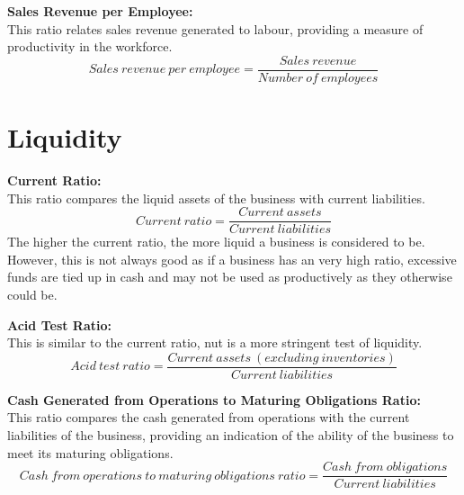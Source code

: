 \documentclass{report}
\newenvironment{blackbox}[1][Black]
  {\begin{tcolorbox}[colframe=#1,colback=white]}
  {\end{tcolorbox}}
\begin{document}
\begin{blackbox}
    \textbf{Sales Revenue per Employee:}\\
    This ratio relates sales revenue generated to labour, providing a measure of productivity in the workforce.
    \begin{equation}
        Sales \: revenue \: per \: employee = \frac{Sales \: revenue}{Number \: of \: employees}
    \end{equation}
\end{blackbox}

\section{Liquidity}

\begin{blackbox}
    \textbf{Current Ratio:}\\
    This ratio compares the liquid assets of the business with current liabilities.
    \begin{equation}
        Current \: ratio = \frac{Current \: assets}{Current \: liabilities}
    \end{equation}
    The higher the current ratio, the more liquid a business is considered to be. However, this is not always good as if a business has an very high ratio, excessive funds are tied up in cash and may not be used as productively as they otherwise could be.
\end{blackbox}

\begin{blackbox}
    \textbf{Acid Test Ratio:}\\
    This is similar to the current ratio, nut is a more stringent test of liquidity.
    \begin{equation}
        Acid \: test \: ratio = \frac{Current \: assets \: (excluding \: inventories)}{Current \: liabilities}
    \end{equation}
\end{blackbox}

\begin{blackbox}
    \textbf{Cash Generated from Operations to Maturing Obligations Ratio:}\\
    This ratio compares the cash generated from operations with the current liabilities of the business, providing an indication of the ability of the business to meet its maturing obligations.
    \begin{equation}
        Cash \: from \: operations \: to \: maturing \: obligations \: ratio = \frac{Cash \: from \: obligations}{Current \: liabilities}
    \end{equation}
\end{blackbox}
\end{document}
